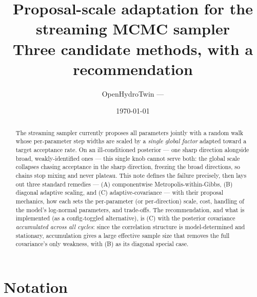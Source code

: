 \documentclass[11pt]{article}
\title{\bfseries Proposal-scale adaptation for the streaming MCMC sampler\\[3pt]
\large Three candidate methods, with a recommendation}
\author{OpenHydroTwin --- \code{DTStreamingMCMC}}
\date{\today}
\begin{document}
\maketitle

\begin{abstract}
The streaming sampler currently proposes all parameters jointly with a
random walk whose per-parameter step widths are scaled by a \emph{single
global factor} adapted toward a target acceptance rate. On an
ill-conditioned posterior --- one sharp direction alongside broad,
weakly-identified ones --- this single knob cannot serve both: the global
scale collapses chasing acceptance in the sharp direction, freezing the
broad directions, so chains stop mixing and never plateau. This note
defines the failure precisely, then lays out three standard remedies ---
(A) componentwise Metropolis-within-Gibbs, (B) diagonal adaptive scaling,
and (C) adaptive-covariance --- with their proposal mechanics, how each
sets the per-parameter (or per-direction) scale, cost, handling of the
model's log-normal parameters, and trade-offs. The recommendation, and
what is implemented (as a config-toggled alternative), is (C) with the
posterior covariance \emph{accumulated across all cycles}: since the
correlation structure is model-determined and stationary, accumulation
gives a large effective sample size that removes the full covariance's only
weakness, with (B) as its diagonal special case.
\end{abstract}

\section*{Notation}
\end{document}
